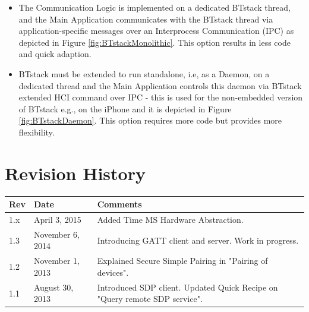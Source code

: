 \documentclass[a4paper,titlepage,oneside,12pt]{amsart} %
\begin{document}
\begin{itemize}
\item The Communication Logic is implemented on a dedicated BTstack thread, and the Main Application communicates with the BTstack thread via application-specific messages over an Interprocess Communication (IPC) as depicted in Figure \ref{fig:BTstackMonolithic}. This option results in less code and quick adaption.
\item BTstack must be extended to run standalone, i.e, as a Daemon, on a dedicated thread and the Main Application controls this daemon via BTstack extended HCI command over IPC - this is used for the non-embedded version of BTstack e.g., on the iPhone and it is depicted in Figure \ref{fig:BTstackDaemon}. This option requires more code but provides more flexibility.
\end{itemize}


\pagebreak

\appendix
	    
	

\pagebreak

\section{Revision History}
\label{appendix:revision_history}

\begin{table}[!htbp]
\begin{tabular*}{\textwidth}{lp{3.5cm}p{8.5cm}}\toprule
Rev & Date & Comments\\ 
\midrule
1.x & April 3, 2015 & Added Time MS Hardware Abstraction.\\
1.3 & November 6, 2014 & Introducing GATT client and server. Work in progress.\\
1.2 & November 1, 2013 & Explained Secure Simple Pairing in "Pairing of devices".\\
1.1 & August 30, 2013 & Introduced SDP client. Updated Quick Recipe on "Query remote SDP service".\\
\bottomrule
\end{tabular*}
\end{table}

%
%
\end{document}
